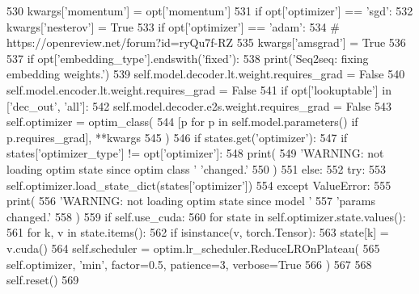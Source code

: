 \begin{DoxyCode}
530                 kwargs[\textcolor{stringliteral}{'momentum'}] = opt[\textcolor{stringliteral}{'momentum'}]
531                 \textcolor{keywordflow}{if} opt[\textcolor{stringliteral}{'optimizer'}] == \textcolor{stringliteral}{'sgd'}:
532                     kwargs[\textcolor{stringliteral}{'nesterov'}] = \textcolor{keyword}{True}
533             \textcolor{keywordflow}{if} opt[\textcolor{stringliteral}{'optimizer'}] == \textcolor{stringliteral}{'adam'}:
534                 \textcolor{comment}{# https://openreview.net/forum?id=ryQu7f-RZ}
535                 kwargs[\textcolor{stringliteral}{'amsgrad'}] = \textcolor{keyword}{True}
536 
537             \textcolor{keywordflow}{if} opt[\textcolor{stringliteral}{'embedding\_type'}].endswith(\textcolor{stringliteral}{'fixed'}):
538                 print(\textcolor{stringliteral}{'Seq2seq: fixing embedding weights.'})
539                 self.model.decoder.lt.weight.requires\_grad = \textcolor{keyword}{False}
540                 self.model.encoder.lt.weight.requires\_grad = \textcolor{keyword}{False}
541                 \textcolor{keywordflow}{if} opt[\textcolor{stringliteral}{'lookuptable'}] \textcolor{keywordflow}{in} [\textcolor{stringliteral}{'dec\_out'}, \textcolor{stringliteral}{'all'}]:
542                     self.model.decoder.e2s.weight.requires\_grad = \textcolor{keyword}{False}
543             self.optimizer = optim\_class(
544                 [p \textcolor{keywordflow}{for} p \textcolor{keywordflow}{in} self.model.parameters() \textcolor{keywordflow}{if} p.requires\_grad], **kwargs
545             )
546             \textcolor{keywordflow}{if} states.get(\textcolor{stringliteral}{'optimizer'}):
547                 \textcolor{keywordflow}{if} states[\textcolor{stringliteral}{'optimizer\_type'}] != opt[\textcolor{stringliteral}{'optimizer'}]:
548                     print(
549                         \textcolor{stringliteral}{'WARNING: not loading optim state since optim class '} \textcolor{stringliteral}{'changed.'}
550                     )
551                 \textcolor{keywordflow}{else}:
552                     \textcolor{keywordflow}{try}:
553                         self.optimizer.load\_state\_dict(states[\textcolor{stringliteral}{'optimizer'}])
554                     \textcolor{keywordflow}{except} ValueError:
555                         print(
556                             \textcolor{stringliteral}{'WARNING: not loading optim state since model '}
557                             \textcolor{stringliteral}{'params changed.'}
558                         )
559                     \textcolor{keywordflow}{if} self.use\_cuda:
560                         \textcolor{keywordflow}{for} state \textcolor{keywordflow}{in} self.optimizer.state.values():
561                             \textcolor{keywordflow}{for} k, v \textcolor{keywordflow}{in} state.items():
562                                 \textcolor{keywordflow}{if} isinstance(v, torch.Tensor):
563                                     state[k] = v.cuda()
564             self.scheduler = optim.lr\_scheduler.ReduceLROnPlateau(
565                 self.optimizer, \textcolor{stringliteral}{'min'}, factor=0.5, patience=3, verbose=\textcolor{keyword}{True}
566             )
567 
568         self.reset()
569 
\end{DoxyCode}


